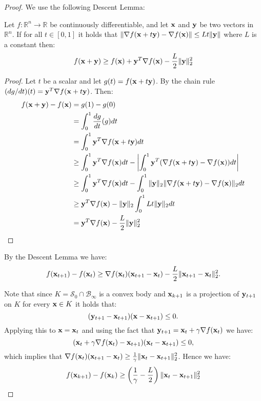 \begin{proof}
	
	We use the following Descent Lemma:
	
	\begin{proposition}
		Let $f \colon \mathbb R^n \to \mathbb R$ be continuously differentiable, and let $\mathbf x$ and $\mathbf y$ be two vectors in $\mathbb R^n$. If for all $t \in [0,1]$ it holds that $\|\nabla f(\mathbf x + t\mathbf y) - \nabla f(\mathbf x)\| \le L t \|\mathbf y\|$ where $L$ is a constant then:
		$$f(\mathbf x + \mathbf y) \ge f(\mathbf x) + \mathbf y^T \nabla f(\mathbf x) - \frac{L}{2} \|\mathbf y\|_2^2$$
	\end{proposition}
	\begin{proof}
		Let $t$ be a scalar and let $g(t) = f(\mathbf x + t \mathbf y)$. By the chain rule $(d g / dt)(t) = \mathbf y^T \nabla f(\mathbf x + t\mathbf y)$.
		Then:
		\begin{align*}
		f(\mathbf x + \mathbf y) - f(\mathbf x) &= g(1) - g(0) \\
		& = \int_0^1 \frac{d g}{d t}(g) dt \\
		& = \int_0^1 \mathbf y^T \nabla f(\mathbf x + t \mathbf y) dt \\
		&\ge \int_0^1 \mathbf y^T \nabla f(\mathbf x) dt - \left|\int_0^1 \mathbf y^T (\nabla f(\mathbf x + t \mathbf y) - \nabla f(\mathbf x)) dt\right| \\
		&\ge \int_0^1 \mathbf y^T \nabla f(\mathbf x) dt  - \int_0^1 \|\mathbf y\|_2 \|\nabla f(\mathbf x + t \mathbf y) - \nabla f(\mathbf x)\|_2dt\\
		& \ge \mathbf y^T \nabla f(\mathbf x) - \|\mathbf y\|_2 \int_0^1 L t \|\mathbf y\|_2 dt \\
		& = \mathbf y^T \nabla f(\mathbf x) - \frac{L}{2} \|\mathbf y\|_2^2
		\end{align*}
	\end{proof}
	
	
	By the Descent Lemma we have:
	\begin{align*}
	f(\mathbf x_{t + 1}) - f(\mathbf x_t) \ge \nabla f(\mathbf x_t)(\mathbf x_{t + 1} - \mathbf x_t) - \frac{L}{2}\|\mathbf x_{t + 1} - \mathbf x_t\|_2^2.
	\end{align*}
	
	Note that since $K = \mathcal S_0 \cap \mathcal B_\infty$ is a convex body and $\mathbf x_{k + 1}$ is a projection of $\mathbf y_{t + 1}$ on $K$ for every $\mathbf x \in K$ it holds that:
	$$(\mathbf y_{t + 1} - \mathbf x_{t + 1})(\mathbf x - \mathbf x_{t + 1}) \le 0.$$
	Applying this to $\mathbf x = \mathbf x_t$ and using the fact that $\mathbf y_{t + 1} = \mathbf x_t + \gamma \nabla f(\mathbf x_t)$ we have:
	$$(\mathbf x_t + \gamma \nabla f(\mathbf x_t) - \mathbf x_{t + 1})(\mathbf x_t - \mathbf x_{t + 1}) \le 0,$$
	which implies that $\nabla f(\mathbf x_t) (\mathbf x_{t+1} - \mathbf x_{t}) \ge \frac{1}{\gamma}\|\mathbf x_t - \mathbf x_{t+1}\|_2^2$. Hence we have:
	\begin{align*}
	f(\mathbf x_{k + 1}) - f(\mathbf x_k) \ge \left(\frac{1}{\gamma} - \frac{L}{2}\right)\|\mathbf x_t - \mathbf x_{t+1}\|_2^2
	\end{align*}
	

\end{proof}
